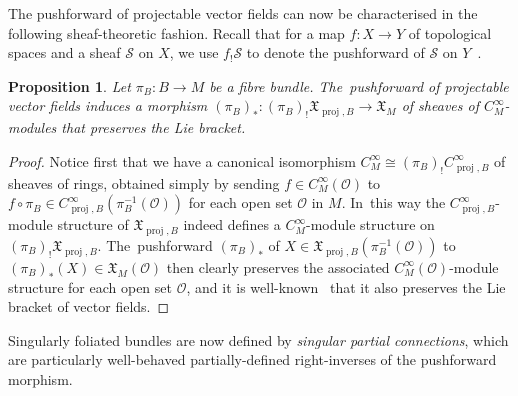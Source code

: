 \documentclass[10pt,a4paper]{amsart}
\numberwithin{equation}{section}
\newtheorem{Proposition}[Theorem]{Proposition}
\def\proj{\operatorname{proj}}
\def\OO{{\mathcal{O}}}
\def\SS{{\mathscr{S}}}
\def\XF{{\mathfrak{X}}}
\begin{document}
The pushforward of projectable vector fields can now be characterised in the following sheaf-theoretic fashion. Recall that for a map $f\colon X\rightarrow Y$ of topological spaces and a sheaf $\SS$ on $X$, we use $f_{!}\SS$ to denote the pushforward of $\SS$ on $Y$~\cite[p.~65]{hartshorne}.

\begin{Proposition}
Let $\pi_{B}\colon B\rightarrow M$ be a fibre bundle. The~pushforward of projectable vector fields induces a morphism $(\pi_{B})_{*}\colon (\pi_{B})_{!}\XF_{\proj,B}\rightarrow\XF_{M}$ of sheaves of $C^{\infty}_{M}$-modules that preserves the Lie bracket.
\end{Proposition}

\begin{proof}
Notice first that we have a canonical isomorphism $C^{\infty}_{M}\cong (\pi_{B})_{!}C^{\infty}_{\proj,B}$ of sheaves of rings, obtained simply by sending $f\in C^{\infty}_{M}(\OO)$ to $f\circ\pi_{B}\in C^{\infty}_{\proj,B}(\pi_{B}^{-1}(\OO))$ for each open set $\OO$ in $M$. In~this way the $C^{\infty}_{\proj,B}$-module structure of $\XF_{\proj,B}$ indeed defines a $C^{\infty}_{M}$-module structure on $(\pi_{B})_{!}\XF_{\proj,B}$. The~pushforward $(\pi_{B})_{*}$ of $X\in\XF_{\proj,B}(\pi_{B}^{-1}(\OO))$ to $(\pi_{B})_{*}(X)\in\XF_{M}(\OO)$ then clearly preserves the associated $C^{\infty}_{M}(\OO)$-module structure for each open set $\OO$, and it is well-known~\cite[Lemma~3.10]{natopdiffgeom} that it also preserves the Lie bracket of vector fields.
\end{proof}

Singularly foliated bundles are now defined by \textit{singular partial connections}, which are particularly well-behaved partially-defined right-inverses of the pushforward morphism.
\end{document}
